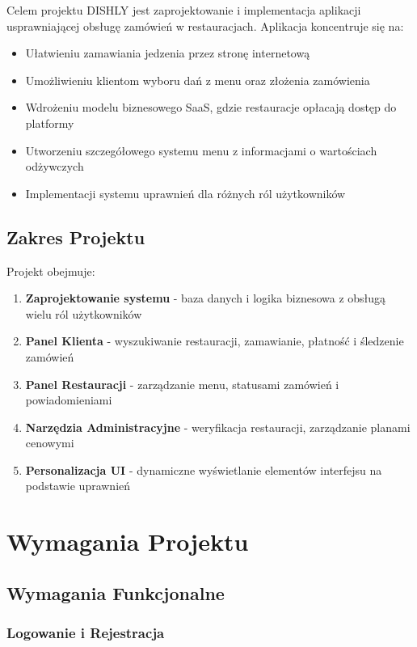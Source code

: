 \documentclass[12pt,a4paper,utf-8]{article}
\begin{document}
Celem projektu DISHLY jest zaprojektowanie i implementacja aplikacji usprawniającej obsługę zamówień w restauracjach. Aplikacja koncentruje się na:
\begin{itemize}
    \item Ułatwieniu zamawiania jedzenia przez stronę internetową
    \item Umożliwieniu klientom wyboru dań z menu oraz złożenia zamówienia
    \item Wdrożeniu modelu biznesowego SaaS, gdzie restauracje opłacają dostęp do platformy
    \item Utworzeniu szczegółowego systemu menu z informacjami o wartościach odżywczych
    \item Implementacji systemu uprawnień dla różnych ról użytkowników
\end{itemize}

\subsection{Zakres Projektu}

Projekt obejmuje:
\begin{enumerate}
    \item \textbf{Zaprojektowanie systemu} - baza danych i logika biznesowa z obsługą wielu ról użytkowników
    \item \textbf{Panel Klienta} - wyszukiwanie restauracji, zamawianie, płatność i śledzenie zamówień
    \item \textbf{Panel Restauracji} - zarządzanie menu, statusami zamówień i powiadomieniami
    \item \textbf{Narzędzia Administracyjne} - weryfikacja restauracji, zarządzanie planami cenowymi
    \item \textbf{Personalizacja UI} - dynamiczne wyświetlanie elementów interfejsu na podstawie uprawnień
\end{enumerate}

\newpage

\section{Wymagania Projektu}

\subsection{Wymagania Funkcjonalne}

\subsubsection{Logowanie i Rejestracja}
\end{document}

